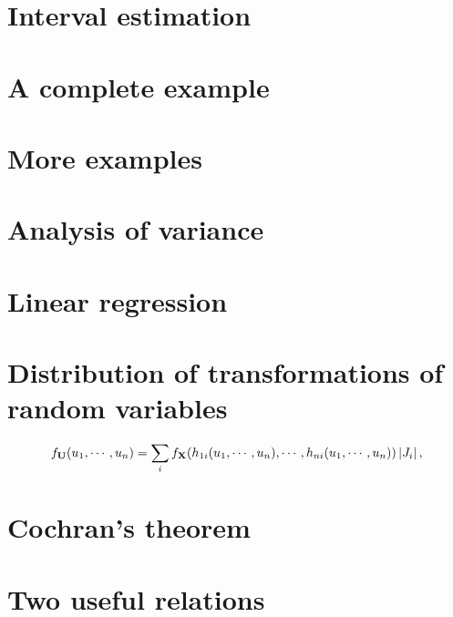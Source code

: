 \documentclass[12pt]{article}
\theoremstyle{definition}
\begin{document}
\section{Interval estimation}

\section{A complete example}

\section{More examples}

\section{Analysis of variance}

\section{Linear regression}

\appendix

  \section{Distribution of transformations of random variables}
  \label{tf}

    \begin{equation}
      f_{{\bf U}}(u_1,\cdots,u_n)=\sum_{i}f_{{\bf X}}
                 (h_{1i}(u_1,\cdots,u_n),\cdots,h_{ni}(u_1,\cdots,u_n))\left|J_i\right|,
    \end{equation}

  \section{Cochran's theorem}

  \section{Two useful relations}

\begin{thebibliography}{99}
\end{thebibliography}
\end{document}
